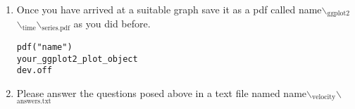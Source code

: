 \documentclass[11pt]{article}
\begin{document}
\begin{enumerate}
\item Once you have arrived at a suitable graph save it as a pdf called name$\backslash$\(_{\text{ggplot2}}\)$\backslash$\(_{\text{time}}\)$\backslash$\(_{\text{series.pdf}}\) as you did before.

\lstset{language=R,label= ,caption= ,captionpos=b,numbers=none}
\begin{lstlisting}
pdf("name")
your_ggplot2_plot_object
dev.off
\end{lstlisting}

\item Please answer the questions posed above in a text file named name$\backslash$\(_{\text{velocity}}\)$\backslash$\(_{\text{answers.txt}}\)
\end{enumerate}
\end{document}
